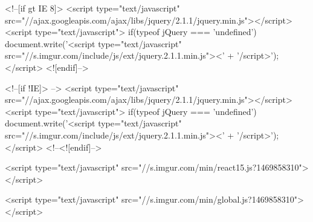 <!--[if gt IE 8]>
<script type="text/javascript" src="//ajax.googleapis.com/ajax/libs/jquery/2.1.1/jquery.min.js"></script>
<script type="text/javascript">
if(typeof jQuery === 'undefined') {
    document.write('<script type="text/javascript" src="//s.imgur.com/include/js/ext/jquery.2.1.1.min.js"><' + '/script>');
}
</script>
<![endif]-->

<!--[if !IE]> -->
<script type="text/javascript" src="//ajax.googleapis.com/ajax/libs/jquery/2.1.1/jquery.min.js"></script>
<script type="text/javascript">
if(typeof jQuery === 'undefined') {
    document.write('<script type="text/javascript" src="//s.imgur.com/include/js/ext/jquery.2.1.1.min.js"><' + '/script>');
}
</script>
<!--<![endif]-->



                    <script type="text/javascript" src="//s.imgur.com/min/react15.js?1469858310"></script>

        
        <script type="text/javascript" src="//s.imgur.com/min/global.js?1469858310"></script>

